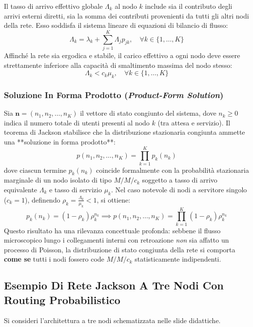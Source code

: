 \documentclass[11pt, a4paper]{article}
\begin{document}
Il tasso di arrivo effettivo globale $\Lambda_k$ al nodo $k$ include sia il contributo degli arrivi esterni diretti, sia la somma dei contributi provenienti da tutti gli altri nodi della rete. Esso soddisfa il sistema lineare di equazioni di bilancio di flusso:
\[
\boxed{\Lambda_k = \lambda_k + \sum_{j=1}^K \Lambda_j p_{jk}, \quad \forall k \in \{1, \dots, K\}}
\]
Affinché la rete sia ergodica e stabile, il carico effettivo a ogni nodo deve essere strettamente inferiore alla capacità di smaltimento massima del nodo stesso:
\[
\Lambda_k < c_k \mu_k, \quad \forall k \in \{1, \dots, K\}
\]

\subsubsection{Soluzione In Forma Prodotto (\emph{Product-Form Solution})}

Sia $\bm{n} = (n_1, n_2, \dots, n_K)$ il vettore di stato congiunto del sistema, dove $n_k \ge 0$ indica il numero totale di utenti presenti al nodo $k$ (tra attesa e servizio). Il teorema di Jackson stabilisce che la distribuzione stazionaria congiunta ammette una **soluzione in forma prodotto**:
\[
\boxed{p(n_1, n_2, \dots, n_K) = \prod_{k=1}^K p_k(n_k)}
\]
dove ciascun termine $p_k(n_k)$ coincide formalmente con la probabilità stazionaria marginale di un nodo isolato di tipo $M/M/c_k$ soggetto a tasso di arrivo equivalente $\Lambda_k$ e tasso di servizio $\mu_k$. Nel caso notevole di nodi a servitore singolo ($c_k = 1$), definendo $\rho_k = \frac{\Lambda_k}{\mu_k} < 1$, si ottiene:
\[
p_k(n_k) = (1 - \rho_k) \rho_k^{n_k} \implies p(n_1, n_2, \dots, n_K) = \prod_{k=1}^K (1 - \rho_k) \rho_k^{n_k}
\]
Questo risultato ha una rilevanza concettuale profonda: sebbene il flusso microscopico lungo i collegamenti interni con retroazione \emph{non} sia affatto un processo di Poisson, la distribuzione di stato congiunta della rete si comporta \textbf{come se} tutti i nodi fossero code $M/M/c_k$ statisticamente indipendenti.

\subsection{Esempio Di Rete Jackson A Tre Nodi Con Routing Probabilistico}

Si consideri l'architettura a tre nodi schematizzata nelle slide didattiche.

\end{document}
